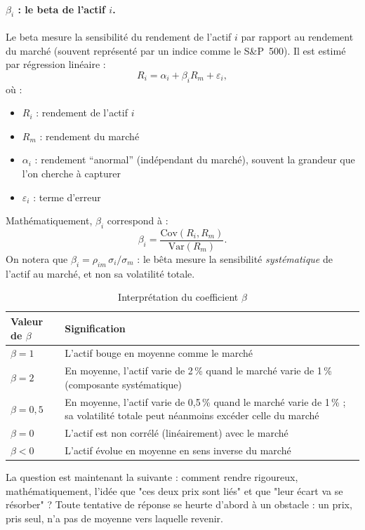 \documentclass{article}
\begin{document}
\paragraph{$\beta_i$ : le beta de l'actif $i$.}
Le beta mesure la sensibilité du rendement de l'actif $i$ par rapport au rendement du marché (souvent représenté par un indice comme le S\&P~500). Il est estimé par régression linéaire :
\begin{equation}
    R_i = \alpha_i + \beta_i R_m + \varepsilon_i,
\end{equation}
où :
\begin{itemize}
    \item $R_i$ : rendement de l'actif $i$
    \item $R_m$ : rendement du marché
    \item $\alpha_i$ : rendement ``anormal'' (indépendant du marché), souvent la grandeur que l'on cherche à capturer
    \item $\varepsilon_i$ : terme d'erreur
\end{itemize}
Mathématiquement, $\beta_i$ correspond à :
\begin{equation}
    \beta_i = \frac{\text{Cov}(R_i, R_m)}{\text{Var}(R_m)}.
\end{equation}
On notera que $\beta_i = \rho_{im}\,\sigma_i/\sigma_m$ : le bêta mesure la sensibilité \emph{systématique} de l'actif au marché, et non sa volatilité totale. 
\begin{table}[H]
    \centering
    \begin{tabular}{ll}
        \toprule
        \textbf{Valeur de $\beta$} & \textbf{Signification} \\
        \midrule
        $\beta = 1$      & L'actif bouge en moyenne comme le marché \\
        $\beta = 2$      & En moyenne, l'actif varie de 2\,\% quand le marché varie de 1\,\% (composante systématique) \\
        $\beta = 0{,}5$  & En moyenne, l'actif varie de 0{,}5\,\% quand le marché varie de 1\,\% ; sa volatilité totale peut néanmoins excéder celle du marché \\
        $\beta = 0$      & L'actif est non corrélé (linéairement) avec le marché \\
        $\beta < 0$      & L'actif évolue en moyenne en sens inverse du marché \\
        \bottomrule
    \end{tabular}
    \caption{Interprétation du coefficient $\beta$}
    \label{tab:beta_interpretation}
\end{table}
La question est maintenant la suivante : comment rendre rigoureux, mathématiquement, l'idée que "ces deux prix sont liés" et que "leur écart va se résorber" ? Toute tentative de réponse se heurte d'abord à un obstacle : un prix, pris seul, n'a pas de moyenne vers laquelle revenir.
\end{document}
